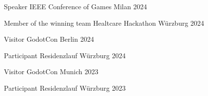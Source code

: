 

\begin{cvhonors}

    \cvhonor
      {Speaker} %
      {IEEE Conference of Games} %
      {Milan} %
      {2024} %

  \cvhonor
    {Member of the winning team} %
    {Healtcare Hackathon} %
    {Würzburg} %
    {2024} %

  \cvhonor
    {Visitor} %
    {GodotCon} %
    {Berlin} %
    {2024} %
    
  \cvhonor
    {Participant} %
    {Residenzlauf} %
    {Würzburg} %
    {2024} %

  \cvhonor
    {Visitor} %
    {GodotCon} %
    {Munich} %
    {2023} %


  \cvhonor
    {Participant} %
    {Residenzlauf} %
    {Würzburg} %
    {2023} %

\end{cvhonors}
